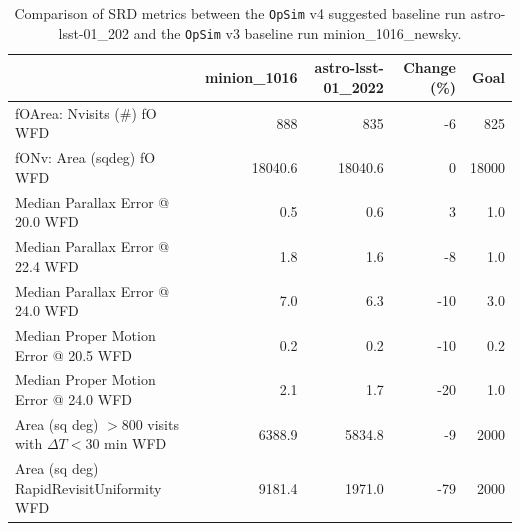 \documentclass[DM,lsstdraft,authoryear,toc]{lsstdoc}
\newcommand{\opsim}{\texttt{OpSim}\xspace}
\begin{document}
\begin{table}
\caption{Comparison of SRD metrics between the \opsim v4 suggested baseline run \break astro-lsst-01\_202 and the \opsim v3 baseline run minion\_1016\_newsky.}
\small
\begin{tabular}{lrrrr}
\toprule
{} &  minion\_1016 &  astro-lsst-01\_2022 &  Change (\%) &  Goal \\
\midrule
fOArea: Nvisits (\#) fO WFD            &                 888 &                 835 &         -6 &   825 \\
fONv: Area (sqdeg) fO WFD             &             18040.6 &             18040.6 &          0 & 18000 \\
Median Parallax Error @ 20.0 WFD      &                 0.5 &                 0.6 &          3 &   1.0 \\
Median Parallax Error @ 22.4 WFD      &                 1.8 &                 1.6 &         -8 &   1.0 \\
Median Parallax Error @ 24.0 WFD      &                 7.0 &                 6.3 &        -10 &   3.0 \\
Median Proper Motion Error @ 20.5 WFD  &                 0.2 &                 0.2 &        -10 &   0.2 \\
Median Proper Motion Error @ 24.0 WFD  &                 2.1 &                 1.7 &        -20 &   1.0 \\
Area (sq deg) $>800$ visits with $\Delta T< 30$ min WFD &              6388.9 &              5834.8 &         -9 &  2000 \\
Area (sq deg) RapidRevisitUniformity WFD &              9181.4 &              1971.0 &        -79 &  2000 \\
\bottomrule
\end{tabular}
\label{tab:srd-comparison}
\end{table}
\end{document}
